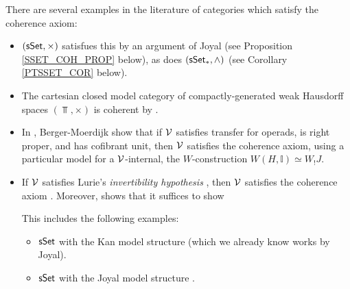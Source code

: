 \documentclass[a4paper,10pt
,draft
]{article}%
\newcommand{\I}{\mathbb I}
\renewcommand{\1}{\eta}%
\begin{document}
\begin{example}
      There are several examples in the literature of categories which satisfy the coherence axiom:
      \begin{itemize}
      \item $(\mathsf{sSet}, \times)$ satisfues this by an argument of Joyal (see Proposition \ref{SSET_COH_PROP} below),
            as does $(\sSet_{\**}, \wedge)$ (see Corollary \ref{PTSSET_COR} below). 
      \item The cartesian closed model category of compactly-generated weak Hausdorff spaces $(\Top, \times)$ is coherent by \cite[Lem. 4.16]{BV73}.
      \item In \cite[Prop. 2.24]{BM13}, Berger-Moerdijk show that if $\mathcal V$ satisfies transfer for operads, is right proper, and has cofibrant unit,
            then $\mathcal V$ satisfies the coherence axiom,
            using a particular model for a $\mathcal V$-internal, the $W$-construction $W(H, \I) \simeq W_! J$.
      \item If $\mathcal V$ satisfies Lurie's \textit{invertibility hypothesis} \cite[A.3.2.12]{Lur09}, then $\mathcal V$ satisfies the coherence axiom \cite[Rem. 2.19]{BM13}.
            Moreover, \cite{Law} shows that it suffices to show
            This includes the following examples:
            \begin{itemize}
            \item $\mathsf{sSet}$ with the Kan model structure \cite{DK80} (which we already know works by Joyal).
            \item $\mathsf{sSet}$ with the Joyal model structure \cite[A.3.2.23]{Lur09}.
            \end{itemize}
      \end{itemize}
\end{example}
\end{document}
